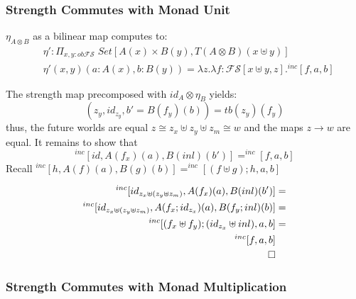 \documentclass{article}
\begin{document}
\subsubsection{Strength Commutes with Monad Unit}
\begin{figure}[!ht]
    \centering
\end{figure}
$\eta_{A\otimes B}$ as a bilinear map computes to:
\begin{align*}
    & \eta' : \Pi_{x,y :ob \mathcal{FS}}\; Set[A(x)\times B(y) , T(A\otimes B)(x \uplus y)] \\
    & \eta' (x , y)(a : A(x), b :B(y)) = \lambda z . \lambda f: \mathcal{FS}[x \uplus y , z].^{inc}[f , a , b]
\end{align*}

The strength map precomposed with $id_A \otimes \eta_B$ yields:
\[
    (z_y , id_{z_y}, b' = B(f_y)(b)) = tb(z_y)(f_y)  
\]
thus, the future worlds are equal $z \cong z_x \uplus z_y \uplus z_m \cong w$ and the maps $z\rightarrow w$ are equal.
It remains to show that
\[
    ^{inc}[id, A(f_x)(a), B(inl)(b')] = ^{inc}[f , a , b]
\]
Recall $ ^{inc}[h , A(f)(a), B(g)(b)] = ^{inc}[(f \uplus g) ; h , a , b]  $

\begin{align*}
    ^{inc}[id_{z_x \uplus (z_y \uplus z_m)}, A(f_x)(a), B(inl)(b')] &= \\
    ^{inc}[id_{z_x \uplus (z_y \uplus z_m)}, A(f_x; id_{z_x})(a), B(f_y ; inl)(b)]  &= \\
    ^{inc}[(f_x \uplus f_y) ; (id_{z_x} \uplus inl), a , b] &= \\
    ^{inc}[f , a , b]\\
    \qed
\end{align*}
\subsubsection{Strength Commutes with Monad Multiplication}
\end{document}
